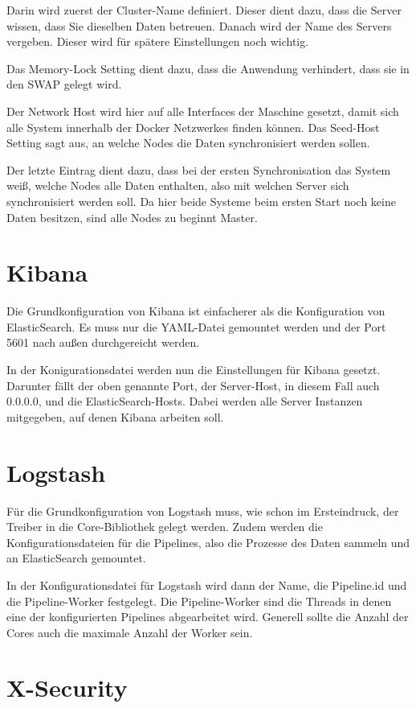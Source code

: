 Darin wird zuerst der Cluster-Name definiert. Dieser dient dazu, dass die Server wissen, dass Sie dieselben Daten betreuen. 
Danach wird der Name des Servers vergeben. Dieser wird für spätere Einstellungen noch wichtig.

Das Memory-Lock Setting dient dazu, dass die Anwendung verhindert, dass sie in den SWAP gelegt wird.

Der Network Host wird hier auf alle Interfaces der Maschine gesetzt, damit sich alle System innerhalb der Docker Netzwerkes finden können.
Das Seed-Host Setting sagt aus, an welche Nodes die Daten synchronisiert werden sollen.

Der letzte Eintrag dient dazu, dass bei der ersten Synchronisation das System weiß, welche Nodes alle Daten enthalten, also mit welchen Server sich synchronisiert werden soll. Da hier beide Systeme beim ersten Start noch keine Daten besitzen, sind alle Nodes zu beginnt Master. 


\section{Kibana}

Die Grundkonfiguration von Kibana ist einfacherer als die Konfiguration von ElasticSearch. Es muss nur die YAML-Datei gemountet werden und der Port 5601 nach außen durchgereicht werden.

In der Konigurationsdatei werden nun die Einstellungen für Kibana gesetzt. Darunter fällt der oben genannte Port, der Server-Host, in diesem Fall auch 0.0.0.0, und die ElasticSearch-Hosts. Dabei werden alle Server Instanzen mitgegeben, auf denen Kibana arbeiten soll. 

\section{Logstash}

Für die Grundkonfiguration von Logstash muss, wie schon im Ersteindruck, der Treiber in die Core-Bibliothek gelegt werden. Zudem werden die Konfigurationsdateien für die Pipelines, also die Prozesse des Daten sammeln und an ElasticSearch gemountet.

In der Konfigurationsdatei für Logstash wird dann der Name, die Pipeline.id und die Pipeline-Worker festgelegt. Die Pipeline-Worker sind die Threads in denen eine der konfigurierten Pipelines abgearbeitet wird. Generell sollte die Anzahl der Cores auch die maximale Anzahl der Worker sein.


\section{X-Security}

